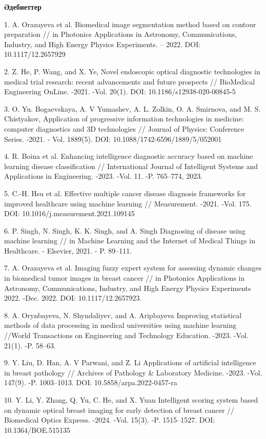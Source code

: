 {\bfseries Әдебиеттер}

1. A. Orazayeva et al. Biomedical image segmentation method based on
contour preparation // in Photonics Applications in Astronomy,
Communications, Industry, and High Energy Physics Experiments. -- 2022.
DOI: 10.1117/12.2657929

2. Z. He, P. Wang, and X. Ye, Novel endoscopic optical diagnostic
technologies in medical trial research: recent advancements and future
prospects // BioMedical Engineering OnLine. -2021. -Vol. 20(1). DOI:
10.1186/s12938-020-00845-5

3. O. Yu. Bogaevskaya, A. V Yumashev, A. L. Zolkin, O. A. Smirnova, and
M. S. Chistyakov, Application of progressive information technologies in
medicine: computer diagnostics and 3D technologies // Journal of
Physics: Conference Series. -2021. - Vol. 1889(5). DOI:
10.1088/1742-6596/1889/5/052001

4. R. Boina et al. Enhancing intelligence diagnostic accuracy based on
machine learning disease classification // International Journal of
Intelligent Systems and Applications in Engineering. -2023. -Vol. 11.
-P. 765--774, 2023.

5. C.-H. Hsu et al. Effective multiple cancer disease diagnosis
frameworks for improved healthcare using machine learning //
Measurement. -2021. -Vol. 175. DOI: 10.1016/j.measurement.2021.109145

6. P. Singh, N. Singh, K. K. Singh, and A. Singh Diagnosing of disease
using machine learning // in Machine Learning and the Internet of
Medical Things in Healthcare. - Elsevier, 2021. - P. 89--111.

7. A. Orazayeva et al. Imaging fuzzy expert system for assessing dynamic
changes in biomedical tumor images in breast cancer // in Photonics
Applications in Astronomy, Communications, Industry, and High Energy
Physics Experiments 2022. -Dec. 2022. DOI: 10.1117/12.2657923.

8. A. Orynbayeva, N. Shyndaliyev, and A. Aripbayeva Improving
statistical methods of data processing in medical universities using
machine learning //World Transactions on Engineering and Technology
Education. -2023. -Vol. 21(1). -P. 58--63.

9. Y. Liu, D. Han, A. V Parwani, and Z. Li Applications of artificial
intelligence in breast pathology // Archives of Pathology \& Laboratory
Medicine. -2023. -Vol. 147(9). -P. 1003--1013. DOI:
10.5858/arpa.2022-0457-ra

10. Y. Li, Y. Zhang, Q. Yu, C. He, and X. Yuan Intelligent scoring
system based on dynamic optical breast imaging for early detection of
breast cancer // Biomedical Optics Express. -2024. -Vol. 15(3). -P.
1515--1527. DOI: 10.1364/BOE.515135

